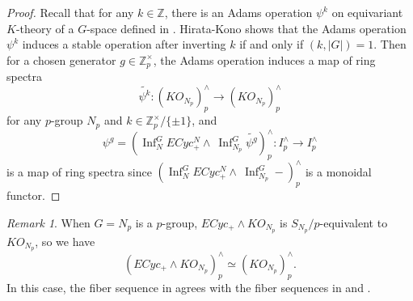 \documentclass{amsart}
\theoremstyle{plain}
\theoremstyle{definition}
\theoremstyle{remark}
\newtheorem{remark}[theorem]{Remark}
\begin{document}
\begin{proof}
    Recall that for any $k\in\mathbb{Z}$, there is an Adams operation $\psi^k$ on equivariant $K$-theory of a $G$-space defined in \cite{atiyah1969group}. Hirata-Kono \cite[Theorem3.1]{hirata1982bott} shows that the Adams operation $\psi^k$ induces a stable operation after inverting $k$ if and only if $(k,|G|)=1$. Then for a chosen generator $g\in \mathbb Z_p^\times$, the Adams operation induces a map of ring spectra 
    \[
    \widetilde{\psi^k}: (KO_{N_p})_p^\wedge\to (KO_{N_p})_{p}^\wedge
    \]
    for any $p$-group $N_p$ and $k\in \mathbb{Z}_p^\times/\{\pm 1\}$, and 
    $$\psi^g=(\operatorname{Inf}_N^G ECyc^N_+\wedge\ \operatorname{Inf}_{N_p}^G \widetilde{\psi^g})_p^{\wedge}: I_p^\wedge \to I_p^\wedge $$ 
    is a map of ring spectra since $(\operatorname{Inf}_N^G ECyc^N_+\wedge\ \operatorname{Inf}_{N_p}^G -)_p^{\wedge}$ is a monoidal functor.
\end{proof}

\begin{remark}\label{rmk:p group}
    When $G=N_p$ is a $p$-group, $ECyc_+\wedge KO_{N_p}$ is $S_{N_p}/p$-equivalent to $KO_{N_p}$, so we have 
    \[
    (ECyc_+\wedge KO_{N_p})_p^{\wedge}\simeq (KO_{N_p})_p^\wedge.
    \]
    In this case, the fiber sequence in  agrees with the fiber sequences in \cite[A.4.13]{balderrama2024total} and \cite[Proposition 6.3]{bonventre2022ku_g}.
\end{remark}
\end{document}
